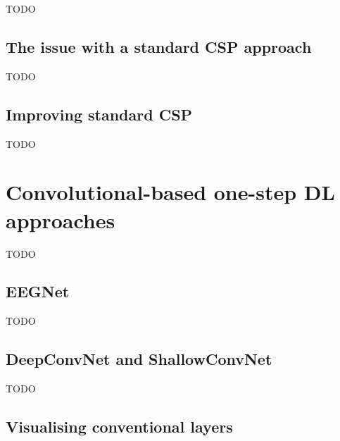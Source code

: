 TODO


\subsection{The issue with a standard CSP approach}
\label{subsec:offline_bci_system_two_step_ml_basic_csp_issue}

TODO


\subsection{Improving standard CSP}
\label{subsec:offline_bci_system_two_step_ml_improving_csp}

TODO

\section{Convolutional-based one-step DL approaches}
\label{sec:offline_bci_system_one_step_dl}


TODO


\subsection{EEGNet}
\label{subsec:offline_bci_system_one_step_dl_eegnet}

TODO


\subsection{DeepConvNet and ShallowConvNet}
\label{subsec:offline_bci_system_one_step_dl_deepconvnet_shallowconvnet}

TODO


\subsection{Visualising conventional layers}
\label{subsec:offline_bci_system_one_step_dl_visualising}

